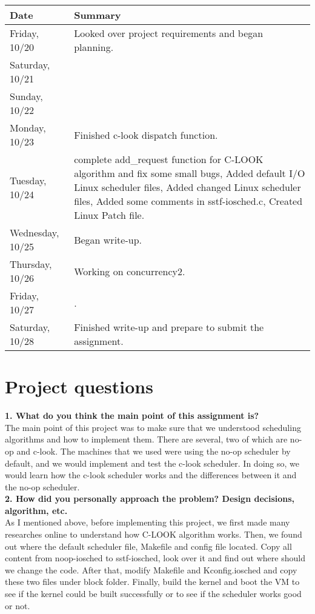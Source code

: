 \documentclass[10pt,letterpaper]{article}
\begin{document}
\begin{tabular}{|l|p{12cm}|} \hline
Date & Summary\\ \hline
Friday, 10/20 & Looked over project requirements and began planning.\\ \hline
Saturday, 10/21 &\\ \hline
Sunday, 10/22 &\\ \hline
Monday, 10/23 &  Finished c-look dispatch function.\\\hline
Tuesday, 10/24 &  complete add\_request function for C-LOOK algorithm and fix some small bugs, Added default I/O Linux scheduler files,  Added changed Linux scheduler files, Added some comments in sstf-iosched.c, Created Linux Patch file. \\ \hline
Wednesday, 10/25 & Began write-up. \\ \hline
Thursday, 10/26 & Working on concurrency2. \\ \hline
Friday, 10/27 & .\\ \hline
Saturday, 10/28 & Finished write-up and prepare to submit the assignment. \\ \hline

\end{tabular}

\section{Project questions}

\textbf{}

\textbf{1. What do you think the main point of this assignment is?}\\

The main point of this project was to make sure that we understood scheduling algorithms and how to implement them. There are several, two of which are no-op and c-look. The machines that we used were using the no-op scheduler by default, and we would implement and test the c-look scheduler. In doing so, we would learn how the c-look scheduler works and the differences between it and the no-op scheduler.\\

\textbf{2. How did you personally approach the problem? Design decisions, algorithm, etc.}\\

As I mentioned above, before implementing this project, we first made many researches online to understand how C-LOOK algorithm works. Then, we found out where the default scheduler file, Makefile and config file located. Copy all content from noop-iosched to sstf-iosched, look over it and find out where should we change the code. After that, modify Makefile and Kconfig.iosched and copy these two files under block folder. Finally, build the kernel and boot the VM to see if the kernel could be built successfully or to see if the scheduler works good or not. \\
\end{document}
